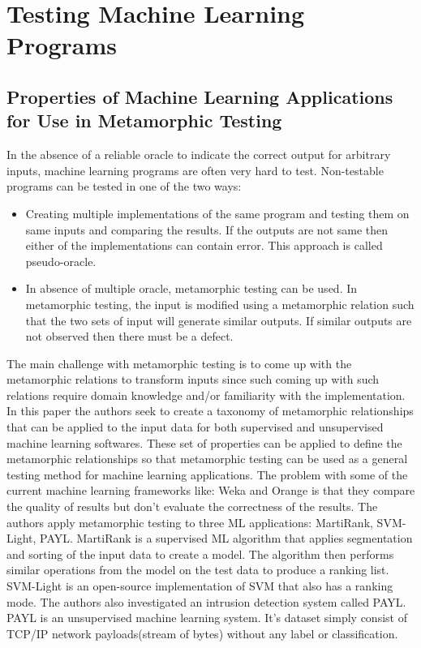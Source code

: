 \section{Testing Machine Learning Programs}
\subsection{Properties of Machine Learning Applications for Use in Metamorphic Testing \cite{Murphy}}
In the absence of a reliable oracle to indicate the correct output for arbitrary inputs, machine learning programs are often very hard to test. Non-testable programs can be tested in one of the two ways:
\begin{itemize}
  \item Creating multiple implementations of the same program and testing them on same inputs and comparing the results. If the outputs are not same then either of the implementations can contain error. This approach is called pseudo-oracle.
  \item In absence of multiple oracle, metamorphic testing can be used. In metamorphic testing, the input is modified using a metamorphic relation such that the two sets of input will generate similar outputs. If similar outputs are not observed then there must be a defect.
\end{itemize}
The main challenge with metamorphic testing is to come up with the metamorphic relations to transform inputs since such coming up with such relations require domain knowledge and/or familiarity with the implementation.
In this paper the authors seek to create a taxonomy of metamorphic relationships that can be applied to the input data for both supervised and unsupervised machine learning softwares. These set of properties can be applied to define the metamorphic relationships so that metamorphic testing can be used as a general testing method for machine learning applications. The problem with some of the current machine learning frameworks like: Weka and Orange is that they compare the quality of results but don’t evaluate the correctness of the results. The authors apply metamorphic testing to three ML applications: MartiRank, SVM-Light, PAYL.
MartiRank is a supervised ML algorithm that applies segmentation and sorting of the input data to create a model. The algorithm then performs similar operations from the model on the test data to produce a ranking list. SVM-Light is an open-source implementation of SVM that also has a ranking mode. The authors also investigated an intrusion detection system called PAYL. PAYL is an unsupervised machine learning system. It’s dataset simply consist of TCP/IP network payloads(stream of bytes) without any label or classification.

